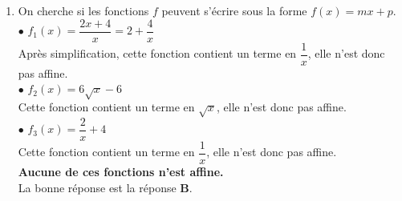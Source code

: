 \documentclass[a4paper,11pt]{article}
\begin{document}
\begin{seanceD}{}
\begin{enumerate}
\medskip
La bonne réponse est la réponse {\bfseries \color[HTML]{F15929}D}.

\item On cherche si les fonctions $f$ peuvent s'écrire sous la forme $f(x)=mx+p$.\\ $\bullet$ $f_1(x)=\dfrac{2x+4}{x}=2+\dfrac{4}{x}$\\
        Après simplification, cette fonction contient un terme en $\dfrac{1}{x}$, elle n'est donc pas affine.\\
        
         $\bullet$ $f_2(x)=6\sqrt{x}-6$\\
        Cette fonction contient un terme en $\sqrt{x}$, elle n'est donc pas affine.\\        $\bullet$ $f_3(x)=\dfrac{2}{x}+4$\\
        Cette fonction contient un terme en $\dfrac{1}{x}$, elle n'est donc pas affine.\\
{\bfseries \color[HTML]{F15929}Aucune de ces fonctions n'est affine.}\\La bonne réponse est la réponse {\bfseries \color[HTML]{F15929}B}.

\end{enumerate}

\end{seanceD}
\end{document}
